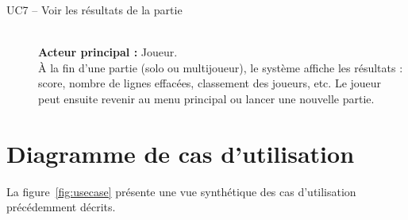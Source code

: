 \documentclass[a4paper,11pt]{article}
\begin{document}
\begin{description}
  \item[UC7 -- Voir les résultats de la partie]%
  \hfill\\
  \textbf{Acteur principal :} Joueur.\\
  À la fin d'une partie (solo ou multijoueur), le système affiche les
  résultats : score, nombre de lignes effacées, classement des joueurs, etc.
  Le joueur peut ensuite revenir au menu principal ou lancer une nouvelle
  partie.

\end{description}

\section{Diagramme de cas d'utilisation}

La figure~\ref{fig:usecase} présente une vue synthétique des cas
d'utilisation précédemment décrits.
\end{document}
